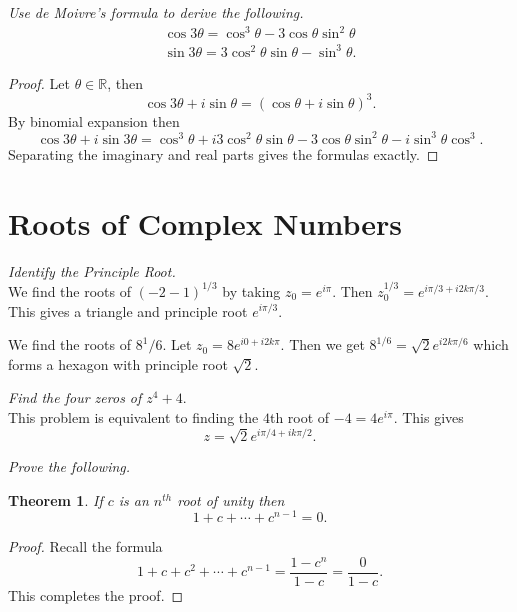 \documentclass[letter]{article}
\newtheorem{theorem}{Theorem}
\newenvironment{menumerate}{%
  \edef\backupindent{\the\parindent}%
  \enumerate%
  \setlength{\parindent}{\backupindent}%
}{\endenumerate}
\begin{document}
\begin{menumerate}
	\item \emph{Use de Moivre's formula to derive the following.}
 \begin{equation}
			\begin{aligned}
				\cos 3\theta = \cos^3 \theta -3\cos \theta \sin^2 \theta \\
				\sin 3 \theta = 3 \cos^2 \theta \sin \theta - \sin^3 \theta.
			\end{aligned}
		\end{equation}
		\begin{proof}
			Let $\theta \in \mathbb{R}$, then
			\begin{equation}
				\cos 3\theta + i\sin\theta = (\cos \theta + i\sin \theta) ^3.
			\end{equation}
			By binomial expansion then
			\begin{equation}
				\cos 3\theta + i\sin3\theta = \cos^3\theta + i3\cos^2\theta \sin\theta -3\cos\theta \sin^2\theta -i\sin^3\theta
				\cos^3.
			\end{equation}
			Separating the imaginary and real parts gives the formulas exactly.
		\end{proof}
\end{menumerate}
\setcounter{section}{10}
\section{Roots of Complex Numbers}
\begin{menumerate}
	\setcounter{enumi}{3}
	\item \emph{Identify the Principle Root.} \\
	We find the roots of $(-2	-1)^{1/3}$ by taking $z_0 = e^{i\pi}.$ Then $z_0^{1/3} = e^{i\pi/3 +i2k\pi/3}$. This gives a triangle and principle root $e^{i\pi/3}.$

	We find the roots of $8^1/6.$ Let $z_0 = 8e^{i0 + i2k\pi}.$ Then we get $8^{1/6}= \sqrt{2}e^{i2k\pi/6}$ which forms a hexagon with principle root $\sqrt{2}.$

	\setcounter{enumi}{5}
	\item \emph{Find the four zeros of $z^4 + 4.$} \\
	This problem is equivalent to finding the $4$th root of $-4 = 4e^{i\pi}.$ This gives
	\begin{equation}
		z = \sqrt{2}e^{i\pi/4 +ik\pi/2}.
	\end{equation}
	\item \emph{Prove the following.}
	\begin{theorem}
		If $c$ is an $n^{th}$ root of unity then \begin{equation}
			1 + c + \cdots + c^{n-1} = 0.
		\end{equation}
	\end{theorem}
	\begin{proof}
		Recall the formula
		\begin{equation}
			1 + c + c^2 +\cdots + c^{n-1} = \frac{1-c^{n}}{1-c} = \frac{0}{1-c}.
		\end{equation}
		This completes the proof.
	\end{proof}
\end{menumerate} 
\setcounter{section}{11}
\end{document}
